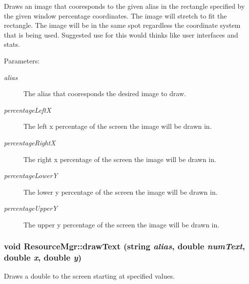 Draws an image that cooresponds to the given alias in the rectangle specified by the given window percentage coordinates. The image will stretch to fit the rectangle. The image will be in the same spot regardless the coordinate system that is being used. Suggested use for this would thinks like user interfaces and stats. \begin{Desc}
\item[Parameters:]
\begin{description}
\item[{\em alias}]The alias that cooresponds the desired image to draw. \item[{\em percentageLeftX}]The left x percentage of the screen the image will be drawn in. \item[{\em percentageRightX}]The right x percentage of the screen the image will be drawn in. \item[{\em percentageLowerY}]The lower y percentage of the screen the image will be drawn in. \item[{\em percentageUpperY}]The upper y percentage of the screen the image will be drawn in. \end{description}
\end{Desc}
\hypertarget{class_resource_mgr_6859acf90546fb86276d6e680fdeae1a}{
\subsubsection[{drawText}]{\setlength{\rightskip}{0pt plus 5cm}void ResourceMgr::drawText (string {\em alias}, \/  double {\em numText}, \/  double {\em x}, \/  double {\em y})}}
\label{class_resource_mgr_6859acf90546fb86276d6e680fdeae1a}


Draws a double to the screen starting at specified values. 

